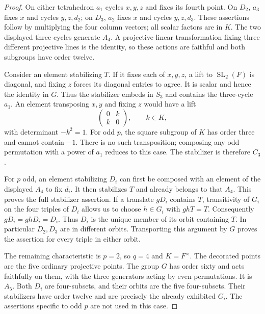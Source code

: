 \begin{proof}
On either tetrahedron $a_1$ cycles $x,y,z$ and fixes its fourth
point. On $D_2$, $a_3$ fixes $x$ and cycles $y,z,d_2$;
on $D_3$, $a_2$ fixes $x$ and cycles $y,z,d_3$.
These assertions follow by multiplying the four column vectors;
all scalar factors are in $K$. The two displayed three-cycles
generate $A_4$. A projective linear transformation fixing three
different projective lines is the identity, so these actions are
faithful and both subgroups have order twelve.

Consider an element stabilizing $T$. If it fixes each of $x,y,z$,
a lift to $\operatorname{SL}_2(F)$ is diagonal, and fixing $z$
forces its diagonal entries to agree. It is scalar and hence the
identity in $G$. Thus the stabilizer embeds in $S_3$ and contains
the three-cycle $a_1$. An element transposing $x,y$ and fixing $z$
would have a lift
\[
                         \begin{pmatrix}0&k\\k&0\end{pmatrix},
                         \qquad k\in K,
\]
with determinant $-k^2=1$. For odd $p$, the square subgroup of
$K$ has order three and cannot contain $-1$. There is no such
transposition; composing any odd permutation with a power of
$a_1$ reduces to this case. The stabilizer is therefore $C_3$.

For $p$ odd, an element stabilizing $D_i$ can first be composed
with an element of the displayed $A_4$ to fix $d_i$.
It then stabilizes $T$ and already belongs to that $A_4$.
This proves the full stabilizer assertion. If a translate $gD_i$
contains $T$, transitivity of $G_i$ on the four triples of $D_i$
allows us to choose $h\in G_i$ with $ghT=T$. Consequently
$gD_i=ghD_i=D_i$. Thus $D_i$ is the unique member of its orbit
containing $T$. In particular $D_2,D_3$ are in different orbits.
Transporting this argument by $G$ proves the assertion for every
triple in either orbit.

The remaining characteristic is $p=2$, so $q=4$ and $K=F^\times$.
The decorated points are the five ordinary projective points.
The group $G$ has order sixty and acts faithfully on them, with
the three generators acting by even permutations. It is $A_5$.
Both $D_i$ are four-subsets, and their orbits are the five
four-subsets. Their stabilizers have order twelve and are precisely
the already exhibited $G_i$. The assertions specific to odd $p$
are not used in this case.
\end{proof}

